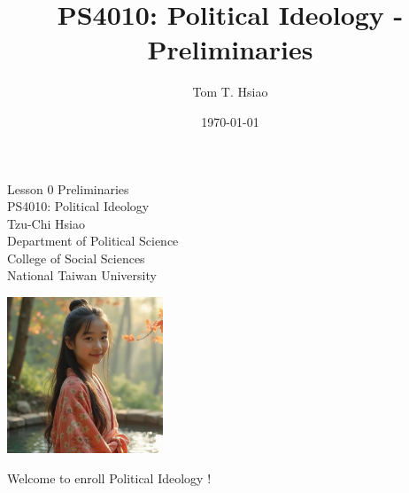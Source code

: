 \documentclass{beamer}
\title{PS4010: Political Ideology - Preliminaries}
\author{Tom T. Hsiao}
\date{\today}
\begin{document}
\begin{frame}
\begin{center}
\Large{Lesson 0 Preliminaries} \\
\vspace{1em}
\large{PS4010: Political Ideology} \\
\vspace{3em}
\normalsize{Tzu-Chi Hsiao} \\
\vspace{3em}
\small{Department of Political Science} \\
\vspace{1em}
\small{College of Social Sciences} \\
\vspace{1em}
\small{National Taiwan University} \\
\end{center}
\end{frame}
\begin{frame}{}
\begin{center}
\includegraphics[width=0.35\textwidth]{instructor.png}
\end{center}
\vspace{1em}
\begin{center}
\large{Welcome to enroll Political Ideology !}
\end{center}
\end{frame}
\end{document}
